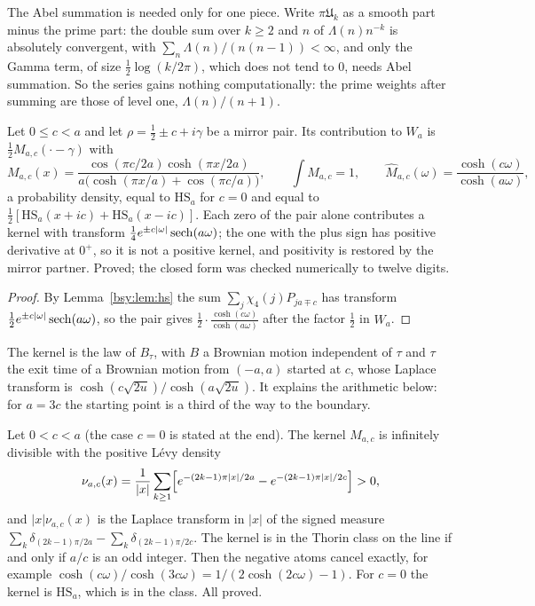 The Abel summation is needed only for one piece. Write $\pi\mathfrak U_k$ as a smooth part minus the prime part: the double sum over $k\ge2$ and $n$ of $\Lambda(n)n^{-k}$ is absolutely convergent, with $\sum_n\Lambda(n)/(n(n-1))<\infty$, and only the Gamma term, of size $\frac12\log(k/2\pi)$, which does not tend to $0$, needs Abel summation. So the series gains nothing computationally: the prime weights after summing are those of level one, $\Lambda(n)/(n+1)$.

\begin{proposition}\label{bsy:prop:meixner2}
Let $0\le c<a$ and let $\rho=\frac12\pm c+i\gamma$ be a mirror pair. Its contribution to $W_a$ is $\frac12M_{a,c}(\cdot-\gamma)$ with
\begin{equation}\label{bsy:eq:meixner2}
M_{a,c}(x)=\frac{\cos(\pi c/2a)\cosh(\pi x/2a)}{a\bigl(\cosh(\pi x/a)+\cos(\pi c/a)\bigr)},\qquad \int M_{a,c}=1,\qquad \widehat M_{a,c}(\omega)=\frac{\cosh(c\omega)}{\cosh(a\omega)},
\end{equation}
a probability density, equal to $\mathrm{HS}_a$ for $c=0$ and equal to $\frac12[\mathrm{HS}_a(x+ic)+\mathrm{HS}_a(x-ic)]$. Each zero of the pair alone contributes a kernel with transform $\frac14e^{\pm c|\omega|}\operatorname{sech}(a\omega)$; the one with the plus sign has positive derivative at $0^+$, so it is not a positive kernel, and positivity is restored by the mirror partner. Proved; the closed form was checked numerically to twelve digits.
\end{proposition}

\begin{proof}
By Lemma~\ref{bsy:lem:hs} the sum $\sum_j\chi_4(j)P_{ja\mp c}$ has transform $\frac12e^{\pm c|\omega|}\operatorname{sech}(a\omega)$, so the pair gives $\frac12\cdot\frac{\cosh(c\omega)}{\cosh(a\omega)}$ after the factor $\frac12$ in $W_a$.
\end{proof}

The kernel is the law of $B_\tau$, with $B$ a Brownian motion independent of $\tau$ and $\tau$ the exit time of a Brownian motion from $(-a,a)$ started at $c$, whose Laplace transform is $\cosh(c\sqrt{2u})/\cosh(a\sqrt{2u})$. It explains the arithmetic below: for $a=3c$ the starting point is a third of the way to the boundary.

\begin{theorem}\label{bsy:thm:dichotomy}
Let $0<c<a$ (the case $c=0$ is stated at the end). The kernel $M_{a,c}$ is infinitely divisible with the positive L\'evy density
\begin{equation}\label{bsy:eq:meixnerlevy}
\nu_{a,c}(x)=\frac1{|x|}\sum_{k\ge1}\Bigl[e^{-(2k-1)\pi|x|/2a}-e^{-(2k-1)\pi|x|/2c}\Bigr]>0,
\end{equation}
and $|x|\nu_{a,c}(x)$ is the Laplace transform in $|x|$ of the signed measure $\sum_k\delta_{(2k-1)\pi/2a}-\sum_k\delta_{(2k-1)\pi/2c}$. The kernel is in the Thorin class on the line if and only if $a/c$ is an odd integer. Then the negative atoms cancel exactly, for example $\cosh(c\omega)/\cosh(3c\omega)=1/(2\cosh(2c\omega)-1)$. For $c=0$ the kernel is $\mathrm{HS}_a$, which is in the class. All proved.
\end{theorem}

